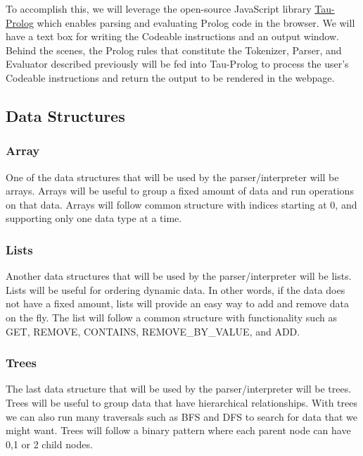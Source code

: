\documentclass{article}
\begin{document}
    To accomplish this, we will leverage the open-source JavaScript
    library \href{https://github.com/tau-Prolog/tau-prolog}{Tau-Prolog}
    which enables parsing and evaluating Prolog code in the browser. We
    will have a text box for writing the Codeable instructions and an
    output window. Behind the scenes, the Prolog rules that constitute
    the Tokenizer, Parser, and Evaluator described previously will be
    fed into Tau-Prolog to process the user's Codeable instructions and
    return the output to be rendered in the webpage.

    \subsection{Data Structures}
    
    \subsubsection{Array}
    
    One of the data structures that will be used by the
    parser/interpreter will be arrays. Arrays will be useful to group a
    fixed amount of data and run operations on that data. Arrays will
    follow common structure with indices starting at 0, and supporting
    only one data type at a time.

    \subsubsection{Lists}
    
    Another data structures that will be used by the parser/interpreter
    will be lists. Lists will be useful for ordering dynamic data. In
    other words, if the data does not have a fixed amount, lists will
    provide an easy way to add and remove data on the fly. The list
    will follow a common structure with functionality such as GET,
    REMOVE, CONTAINS, REMOVE\_BY\_VALUE, and ADD.

    \subsubsection{Trees}
    
    The last data structure that will be used by the parser/interpreter
    will be trees. Trees will be useful to group data that have
    hierarchical relationships. With trees we can also run many
    traversals such as BFS and DFS to search for data that we might
    want. Trees will follow a binary pattern where each parent node can
    have 0,1 or 2 child nodes.
\end{document}

